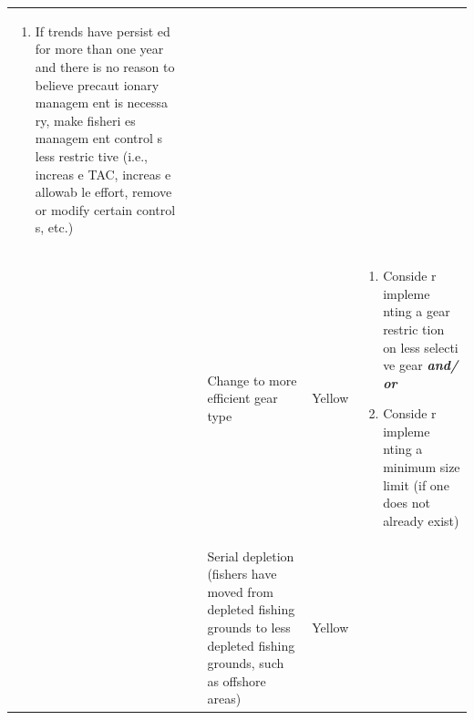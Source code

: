 \documentclass[]{book}
\providecommand{\tightlist}{%
  \setlength{\itemsep}{0pt}\setlength{\parskip}{0pt}}
\begin{document}
\begin{longtable}[]{@{}lllll@{}}
\begin{minipage}[t]{0.19\columnwidth}
\begin{enumerate}
\def\labelenumi{\arabic{enumi}.}
\setcounter{enumi}{1}
\tightlist
\item
  If trends have persist ed for more than one year and there is no
  reason to believe precaut ionary managem ent is necessa ry, make
  fisheri es managem ent control s less restric tive (i.e., increas e
  TAC, increas e allowab le effort, remove or modify certain control s,
  etc.)
\end{enumerate}\strut
\end{minipage}\tabularnewline
\begin{minipage}[t]{0.19\columnwidth}\raggedright\strut
\strut
\end{minipage} & \begin{minipage}[t]{0.19\columnwidth}\raggedright\strut
\strut
\end{minipage} & \begin{minipage}[t]{0.19\columnwidth}\raggedright\strut
Change to more efficient gear type\strut
\end{minipage} & \begin{minipage}[t]{0.19\columnwidth}\raggedright\strut
Yellow\strut
\end{minipage} & \begin{minipage}[t]{0.19\columnwidth}\raggedright\strut
\begin{enumerate}
\def\labelenumi{\arabic{enumi}.}
\item
  Conside r impleme nting a gear restric tion on less selecti ve gear
  \textbf{\emph{and/ or}}
\item
  Conside r impleme nting a minimum size limit (if one does not already
  exist)
\end{enumerate}\strut
\end{minipage}\tabularnewline
\begin{minipage}[t]{0.19\columnwidth}\raggedright\strut
\strut
\end{minipage} & \begin{minipage}[t]{0.19\columnwidth}\raggedright\strut
\strut
\end{minipage} & \begin{minipage}[t]{0.19\columnwidth}\raggedright\strut
Serial depletion (fishers have moved from depleted fishing grounds to
less depleted fishing grounds, such as offshore areas)\strut
\end{minipage} & \begin{minipage}[t]{0.19\columnwidth}\raggedright\strut
Yellow\strut
\end{minipage} & \begin{minipage}[t]{0.19\columnwidth}\raggedright\strut

\end{minipage}
\end{longtable}
\end{document}
